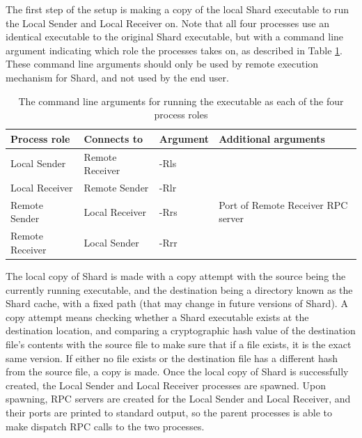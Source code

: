 \documentclass[twoside]{report}
\begin{document}
The first step of the setup is making a copy of the local Shard executable to run the Local Sender and Local Receiver on.
Note that all four processes use an identical executable to the original Shard executable, but with a command line argument indicating which role the processes takes on, as described in Table \ref{fig:process_role_args}.
These command line arguments should only be used by remote execution mechanism for Shard, and not used by the end user.

\begin{table}[h]
  \begin{center}
    \begin{tabular}{|l|l|l|l|}
      \hline
      Process role    & Connects to     & Argument & Additional arguments               \\ \hline
      Local Sender    & Remote Receiver & -Rls     &                                    \\ \hline
      Local Receiver  & Remote Sender   & -Rlr     &                                    \\ \hline
      Remote Sender   & Local Receiver  & -Rrs     & Port of Remote Receiver RPC server \\ \hline
      Remote Receiver & Local Sender    & -Rrr     &                                    \\ \hline
    \end{tabular}
    \caption{The command line arguments for running the executable as each of the four process roles}
    \label{fig:process_role_args}
  \end{center}
\end{table}


The local copy of Shard is made with a copy attempt with the source being the currently running executable, and the destination being a directory known as the Shard cache, with a fixed path (that may change in future versions of Shard).
A copy attempt means checking whether a Shard executable exists at the destination location, and comparing a cryptographic hash value of the destination file's contents with the source file to make sure that if a file exists, it is the exact same version.
If either no file exists or the destination file has a different hash from the source file, a copy is made.
Once the local copy of Shard is successfully created, the Local Sender and Local Receiver processes are spawned.
Upon spawning, RPC servers are created for the Local Sender and Local Receiver, and their ports are printed to standard output, so the parent processes is able to make dispatch RPC calls to the two processes.
\end{document}

